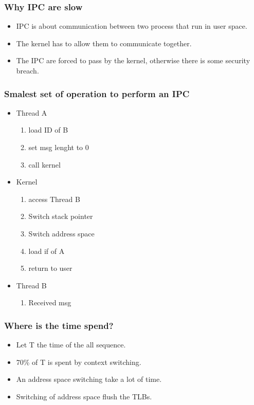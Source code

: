 \begin{frame}
\frametitle{Why IPC are slow}
\begin{itemize}
\item IPC is about communication between two process that run in user
space.
\item The kernel has to allow them to communicate together.
\item The IPC are forced to pass by the kernel, otherwise there is some
security breach.
\end{itemize}
\end{frame}

\begin{frame}
\frametitle{Smalest set of operation to perform an IPC}
\begin{itemize}
\item Thread A
\begin{enumerate}
\item load ID of B
\item set msg lenght to 0
\item call kernel
\end{enumerate}
\item Kernel
\begin{enumerate}
\item access Thread B
\item Switch stack pointer
\item Switch address space
\item load if of A
\item return to user
\end{enumerate}
\item Thread B
\begin{enumerate}
\item Received msg
\end{enumerate}
\end{itemize}
\end{frame}

\begin{frame}
\frametitle{Where is the time spend?}
\begin{itemize}
\item Let T the time of the all sequence.
\item 70\% of T is spent by context switching.
\item An address space switching take a lot of time.
\item Switching of address space flush the TLBs.
\end{itemize}
\end{frame}


